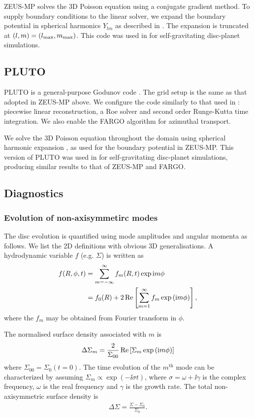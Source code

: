 ZEUS-MP solves the 3D Poisson equation using a conjugate gradient
method. To supply boundary conditions to the linear solver, we
expand the boundary potential in spherical harmonics $Y_{lm}$ 
as described in \cite{boss80}. The expansion is truncated at
$(l,m)=(l_\mathrm{max},m_\mathrm{max})$. This code was used in \cite{lin12b} for
self-gravitating disc-planet simulations.  

\subsection{PLUTO} 
PLUTO is a general-purpose Godunov code \citep{mignone07}. The grid
setup is the same as that adopted in ZEUS-MP above. We configure the
code similarly to that used in \cite{lin14}: piecewise linear
reconstruction, a Roe solver and second order Runge-Kutta time
integration. We also enable the FARGO algorithm for azimuthal
transport. 

We solve the 3D Poisson equation throughout the domain using spherical
harmonic expansion \citep{boss80}, as used for the boundary potential
in ZEUS-MP. This version of PLUTO was used in \cite{lin14b} for
self-gravitating disc-planet simulations, producing similar results to
that of ZEUS-MP and FARGO. 


\subsection{Diagnostics}

\subsubsection{Evolution of non-axisymmetirc modes}
The disc evolution is quantified using mode amplitudes and angular
momenta as follows. We list the 2D definitions with obvious 3D generalisations. 
A hydrodynamic variable $f$ (e.g. $\Sigma$) is written as 
\begin{align}
  f(R,\phi,t) &= \sum_{m=-\infty}^{\infty}f_m(R,t)\exp{\mathrm{i}m \phi} \notag\\
  &= f_0(R) + 2 \operatorname{Re}\left[\sum_{m=1}^\infty f_m \exp{(\mathrm{i}m\phi)}\right], 
\end{align}
where the $f_m$ may be obtained from Fourier transform in $\phi$. 

The normalised surface density associated with $m$ is
\begin{align}
  \Delta\Sigma_m = \frac{2}{\Sigma_{00}} \operatorname{Re}\left[\Sigma_m \exp{(\mathrm{i}m\phi)}\right]
\end{align}
where $\Sigma_{00} = \Sigma_0(t=0)$. The time evolution of the
$m^\mathrm{th}$ mode can be characterized by 
assuming $\Sigma_m\propto\exp{(-\ii \sigma t)}$, where
$\sigma = \omega + \ii\gamma$ is the complex frequency, $\omega$ is
the real frequency and $\gamma$ is the growth rate. The total
non-axisymmetric surface density is 
\begin{align}
  \Delta\Sigma = \frac{\Sigma - \Sigma_0}{\Sigma_0}. 
\end{align}


